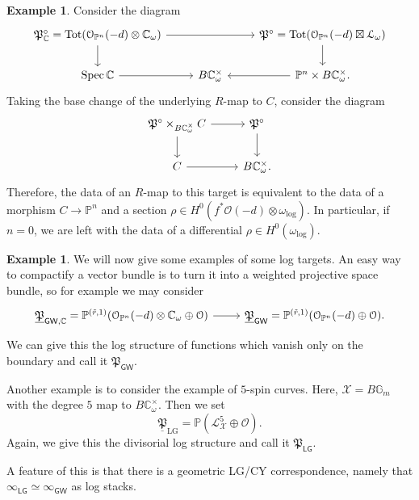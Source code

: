 \documentclass[10pt]{amsart}
\theoremstyle{definition}
\newtheorem{exm}[thm]{Example}
\theoremstyle{remark}
\theoremstyle{plain}
\theoremstyle{definition}
\theoremstyle{remark}
\newcommand{\G}{\mathbb{G}}
\newcommand{\C}{\mathbb{C}}
\renewcommand{\P}{\mathbb{P}}
\newcommand{\mc}[1]{\mathcal{#1}}
\newcommand{\mf}[1]{\mathfrak{#1}}
\newcommand{\mr}[1]{\mathrm{#1}}
\newcommand{\on}[1]{\operatorname{#1}}
\newcommand{\ms}[1]{\mathsf{#1}}
\newcommand{\ul}[1]{\underline{#1}}
\newcommand{\1}{\mathbf{1}}
\newcommand{\2}{\mathbf{2}}
\newcommand{\3}{\mathbf{3}}
\newcommand{\GW}{\ms{GW}}
\newcommand{\LG}{\ms{LG}}
\DeclareMathOperator{\Spec}{Spec}
\begin{document}
\begin{exm}
    Consider the diagram
    \begin{equation*}
    \begin{tikzcd}
        \mf{P}_{\C}^{\circ} = \on{Tot}(\mc{O}_{\P^n}(-d) \otimes \C_{\omega}) \ar{rr} \ar{d} & & \mf{P}^{\circ} = \on{Tot}(\mc{O}_{\P^n}(-d) \boxtimes \mc{L}_{\omega}) \ar{d} \\
        \Spec \C \ar{r} & B \C^{\times}_{\omega} & \P^n \times B \C_{\omega}^{\times} \ar{l}.
    \end{tikzcd}
    \end{equation*}
    Taking the base change of the underlying $R$-map to $C$, consider the diagram
    \begin{equation*}
    \begin{tikzcd}
        \mf{P}^{\circ} \times_{B \C_{\omega}^{\times}} C \ar{r} \ar{d} & \mf{P}^{\circ} \ar{d} \\
        C \ar{r} & B \C_{\omega}^{\times}.
    \end{tikzcd}
    \end{equation*}
    Therefore, the data of an $R$-map to this target is equivalent to the data of a morphism $C \to \P^n$ and a section $\rho \in H^0(f^* \mc{O}(-d) \otimes \omega_{\log})$. In particular, if $n=0$, we are left with the data of a differential $\rho \in H^0(\omega_{\log})$.
\end{exm}

\begin{exm}
    We will now give some examples of some log targets. An easy way to compactify a vector bundle is to turn it into a weighted projective space bundle, so for example we may consider
    \begin{equation*}
    \begin{tikzcd}
        \ul{\mf{P}}_{\ms{GW}, \C} = \P^{(\tilde{r},1)}(\mc{O}_{\P^n}(-d) \otimes \C_{\omega} \oplus \mc{O}) \ar{r} & \ul{\mf{P}}_{\ms{GW}} = \P^{(\tilde{r}, 1)}(\mc{O}_{\P^n}(-d) \oplus \mc{O}).
    \end{tikzcd}
    \end{equation*}
    We can give this the log structure of functions which vanish only on the boundary and call it $\mf{P}_{\GW}$.

    Another example is to consider the example of $5$-spin curves. Here, $\mc{X} = B \G_m$ with the degree $5$ map to $B \C_{\omega}^{\times}$. Then we set
    \[ \ul{\mf{P}}_{\mr{LG}} = \P(\mc{L}_{\mc{X}}^5 \oplus \mc{O}). \]
    Again, we give this the divisorial log structure and call it $\mf{P}_{\LG}$.

    A feature of this is that there is a geometric LG/CY correspondence, namely that $\infty_{\LG} \simeq \infty_{\GW}$ as log stacks.
\end{exm}
\end{document}
